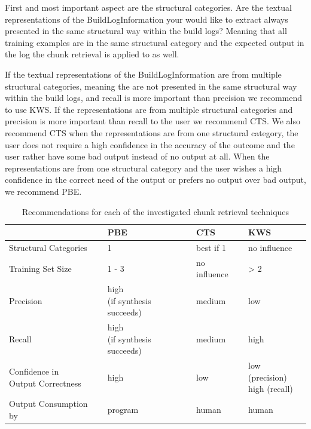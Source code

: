 \documentclass[\myrootdir/main.tex]{subfiles}
\begin{document}
First and most important aspect are the structural categories.
Are the textual representations of the BuildLogInformation your would like to extract always presented in the same structural way within the build logs?
Meaning that all training examples are in the same structural category and the expected output in the log the chunk retrieval is applied to as well.

If the textual representations of the BuildLogInformation are from multiple structural categories, meaning the are  not presented in the same structural way within the build logs, and recall is more important than precision we recommend to use KWS.
If the representations are from multiple structural categories and precision is more important than recall to the user we recommend CTS.
We also recommend CTS when the representations are from one structural category, the user does not require a high confidence in the accuracy of the outcome and the user rather have some bad output instead of no output at all.
When the representations are from one structural category and the user wishes a high confidence in the correct need of the output or prefers no output over bad output, we recommend PBE.

\begin{table}[htbp]
\centering
\begin{tabularx}{\textwidth}{@{}llll@{}}
  \toprule
  & PBE & CTS & KWS \\
  \midrule
  Structural Categories & 1 & best if 1 & no influence \\
  Training Set Size & 1 - 3 & no influence & > 2 \\ 
  Precision & \makecell[l]{high \\ (if synthesis succeeds)} & medium & low \\ 
  Recall & \makecell[l]{high \\ (if synthesis succeeds)} & medium & high \\ 
  \makecell[l]{Confidence in \\ Output Correctness} & high & low & \makecell[l]{low (precision) \\ high (recall)} \\ 
  Output Consumption by & program & human & human \\ 
  \bottomrule
\end{tabularx}
\caption{Recommendations for each of the investigated chunk retrieval techniques}
\label{tab:single-technique-recommendations}
\end{table}
\end{document}
